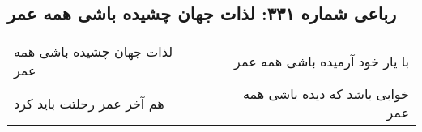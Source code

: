 \begin{center}
\section*{رباعی شماره ۳۳۱: لذات جهان چشیده باشی همه عمر}
\label{sec:sh331}
\begin{longtable}{l p{0.5cm} r}
لذات جهان چشیده باشی همه عمر
&&
با یار خود آرمیده باشی همه عمر
\\
هم آخر عمر رحلتت باید کرد
&&
خوابی باشد که دیده باشی همه عمر
\\
\end{longtable}
\end{center}
